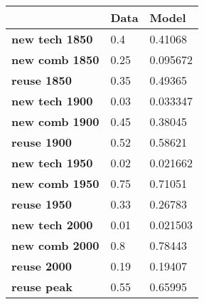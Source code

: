 \begin{tabular}{|l|l|l|}
\hline
&\textbf{Data}&\textbf{Model}\\\hline
\textbf{new tech 1850}&0.4&0.41068\\\hline
\textbf{new comb 1850}&0.25&0.095672\\\hline
\textbf{reuse 1850}&0.35&0.49365\\\hline
\textbf{new tech 1900}&0.03&0.033347\\\hline
\textbf{new comb 1900}&0.45&0.38045\\\hline
\textbf{reuse 1900}&0.52&0.58621\\\hline
\textbf{new tech 1950}&0.02&0.021662\\\hline
\textbf{new comb 1950}&0.75&0.71051\\\hline
\textbf{reuse 1950}&0.33&0.26783\\\hline
\textbf{new tech 2000}&0.01&0.021503\\\hline
\textbf{new comb 2000}&0.8&0.78443\\\hline
\textbf{reuse 2000}&0.19&0.19407\\\hline
\textbf{reuse peak}&0.55&0.65995\\\hline
\end{tabular}
